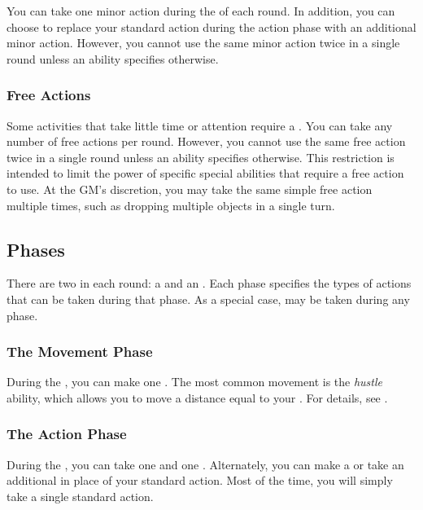             You can take one minor action during the  of each round.
            In addition, you can choose to replace your standard action during the action phase with an additional minor action.
            However, you cannot use the same minor action twice in a single round unless an ability specifies otherwise.

        \subsubsection{Free Actions}\label{Free Actions}
            Some activities that take little time or attention require a .
            You can take any number of free actions per round.
            However, you cannot use the same free action twice in a single round unless an ability specifies otherwise.
            This restriction is intended to limit the power of specific special abilities that require a free action to use.
            At the GM's discretion, you may take the same simple free action multiple times, such as dropping multiple objects in a single turn.

    \subsection{Phases}\label{Phases}

        There are two  in each round: a  and an .
        Each phase specifies the types of actions that can be taken during that phase.
        As a special case,  may be taken during any phase.

        \subsubsection{The Movement Phase}\label{The Movement Phase}
            During the , you can make one .
            The most common movement is the \textit{hustle} ability, which allows you to move a distance equal to your .
            For details, see .

        \subsubsection{The Action Phase}\label{The Action Phase}
            During the , you can take one  and one .
            Alternately, you can make a  or take an additional  in place of your standard action.
            Most of the time, you will simply take a single standard action.

